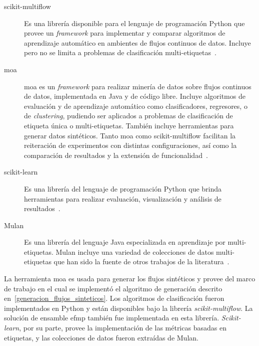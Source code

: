 \begin{description}

	\item[scikit-multiflow] Es una librería disponible para el lenguaje de
	      programación Python que provee un \textit{framework} para implementar y
	      comparar algoritmos de aprendizaje automático en ambientes de flujos
	      continuos de datos.  Incluye pero no se limita a problemas de
	      clasificación multi-etiquetas~\cite{montiel_scikit-multiflow_2018}.

	\item[\acrshort{moa}] \acrfull{moa} es un \textit{framework} para realizar
	      minería de datos sobre flujos continuos de datos, implementada en Java y
	      de código libre.  Incluye algoritmos de evaluación y de aprendizaje
	      automático como clasificadores, regresores, o de \textit{clustering},
	      pudiendo ser aplicados a problemas de clasificación de etiqueta única o
	      multi-etiquetas.  También incluye herramientas para generar datos
	      sintéticos. Tanto \acrshort{moa} como scikit-multiflow facilitan la
	      reiteración de experimentos con distintas configuraciones, así como la
	      comparación de resultados y la extensión de
	      funcionalidad~\cite{bifet_moa_2010}.

	\item[scikit-learn] Es una librería del lenguaje de programación Python que
	      brinda herramientas para realizar evaluación, visualización y análisis
	      de resultados~\cite{pedregosa_scikit-learn_2018}.

	\item[Mulan] Es una librería del lenguaje Java especializada en aprendizaje
	      por multi-etiquetas. Mulan incluye una variedad de colecciones de datos
	      multi-etiquetas que han sido la fuente de otros trabajos de la
	      literatura~\cite{tsoumakas_mulan_2011}.

\end{description}

La herramienta \acrshort{moa} es usada para generar los flujos sintéticos y
provee del marco de trabajo en el cual se implementó el algoritmo de generación
descrito en~\ref{generacion_flujos_sinteticos}. Los algoritmos de clasificación
fueron implementados en Python y están disponibles bajo la librería
\textit{scikit-multiflow}. La solución de ensamble \acrshort{efmp} también fue
implementada en esta librería. \textit{Scikit-learn}, por su parte, provee la
implementación de las métricas basadas en etiquetas, y las colecciones de datos
fueron extraídas de Mulan.

